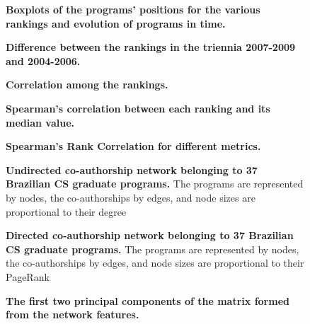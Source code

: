 \documentclass[10pt]{article}
\begin{document}
\begin{figure}[!ht]
\caption{
{\bf Boxplots of the programs' positions for the various rankings and evolution of programs in time.}  
}
\label{fig:position}
\end{figure}

\begin{figure}[!ht]
\caption{
{\bf Difference between the rankings in the triennia 2007-2009 and 2004-2006.}
}
\label{fig:position2}
\end{figure}


\begin{figure}[!ht]
\label{fig:correlation-among}
\caption{{\bf Correlation among the rankings.}}
\end{figure}

\begin{figure}[!ht]
\label{fig:correlation-median}
\caption{ {\bf Spearman's correlation between each ranking and its median value.}}
\end{figure}


\begin{figure}[!ht]
    \caption{ {\bf Spearman's Rank Correlation for different metrics.} }
    \label{fig:correlation-networks}
\end{figure}

\begin{figure}[!ht]
  \label{fig:undirected}
	\caption{ {\bf Undirected co-authorship network belonging to 37 Brazilian CS graduate programs.} The
  programs are represented by nodes, the co-authorships by edges, and node
  sizes are proportional to their degree}  
\end{figure}	

	\begin{figure}[!ht]
  \label{fig:directed}
	\caption{ {\bf Directed co-authorship network belonging to 37 Brazilian CS graduate programs.} The
  programs are represented by nodes, the co-authorships by edges, and node
  sizes are proportional to their PageRank}  
  \end{figure}


\begin{figure}[!ht]
    \caption{{\bf The first two principal components of the matrix formed from the network features.}}
    \label{fig:pca}
\end{figure}
\end{document}
